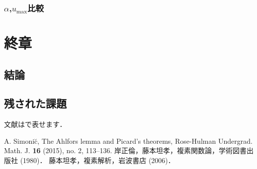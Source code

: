 \documentclass [dvipdfmx] {jsarticle}
\numberwithin{equation}{section}
\theoremstyle{definition} %
\theoremstyle{definition} %
\begin{document}
\subsubsection{$\alpha$,$u_{\max}$比較}
\section{終章}
\subsection{結論}
\subsection{残された課題}
文献は\cite{Si}で表せます．
\begin{thebibliography}{9}
 A. Simoni\u{c}, The Ahlfors lemma and Picard's theorems, 
Rose-Hulman Undergrad. Math. J. {\bf 16} (2015), no. 2, 113--136. 
 岸正倫，藤本坦孝，複素関数論，学術図書出版社 (1980)．
 藤本坦孝，複素解析，岩波書店 (2006)．


\end{thebibliography}
\end{document}
